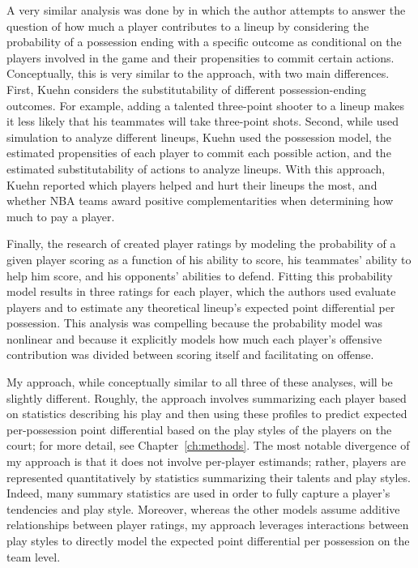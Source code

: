 A very similar analysis was done by \citet{Kuehn} in which the author attempts to
answer the question of how much a player contributes to a lineup by considering the
probability of a possession ending with a specific outcome as conditional on the
players involved in the game and their propensities to commit certain actions.
Conceptually, this is very similar to the \citeauthor{Maymin} approach, with two
main differences. First, Kuehn considers the substitutability of different
possession-ending outcomes. For example, adding a talented three-point shooter to a
lineup makes it less likely that his teammates will take three-point shots. Second,
while \citeauthor{Maymin} used simulation to analyze different lineups, Kuehn used
the possession model, the estimated propensities of each player to commit each
possible action, and the estimated substitutability of actions to analyze lineups.
With this approach, Kuehn reported which players helped and hurt their lineups the
most, and whether NBA teams award positive complementarities when determining how
much to pay a player.

Finally, the research of \citet{Arcidiacono} created player ratings by modeling the
probability of a given player scoring as a function of his ability to score, his
teammates' ability to help him score, and his opponents' abilities to defend.
Fitting this probability model results in three ratings for each player, which the
authors used evaluate players and to estimate any theoretical lineup's expected
point differential per possession. This analysis was compelling because the
probability model was nonlinear and because it explicitly models how much each
player's offensive contribution was divided between scoring itself and facilitating
on offense.

My approach, while conceptually similar to all three of these analyses, will be
slightly different. Roughly, the approach involves summarizing each player based on
statistics describing his play and then using these profiles to predict expected
per-possession point differential based on the play styles of the players on the
court; for more detail, see Chapter~\ref{ch:methods}. The most notable divergence of
my approach is that it does not involve per-player estimands; rather, players are
represented quantitatively by statistics summarizing their talents and play styles.
Indeed, many summary statistics are used in order to fully capture a player's
tendencies and play style. Moreover, whereas the other models assume additive
relationships between player ratings, my approach leverages interactions between
play styles to directly model the expected point differential per possession on the
team level.
